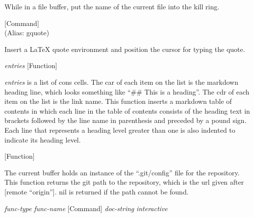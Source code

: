 \begin{doc-string}
While in a file buffer, put the name of the current file into the kill ring.
\end{doc-string}

\vspace{1em}
\noindent
{}
\usebox{\funcname}
 \hfill [Command]\\%
 (Alias: gquote)

\begin{doc-string}
Insert a LaTeX quote environment and position the cursor for typing the quote.
\end{doc-string}

\vspace{1em}
\noindent
{}
\usebox{\funcname}\emph{entries}
 \hfill [Function]

\begin{doc-string}
\emph{entries} is a list of cons cells.  The car of each item on the list is the
markdown heading line, which looks something like ``\#\# This is a heading''.
The cdr of each item on the list is the link name.  This function inserts a
markdown table of contents in which each line in the table of contents
consists of the heading text in brackets followed by the line name in
parenthesis and preceded by a pound sign.  Each line that represents a heading
level greater than one is also indented to indicate its heading level.
\end{doc-string}

\vspace{1em}
\noindent
{}
\usebox{\funcname}
 \hfill [Function]

\begin{doc-string}
The current buffer holds an instance of the ``.git/config'' file for the
repository.  This function returns the git path to the repository, which is the
url given after [remote ``origin''].  nil is returned if the path cannot be
found.
\end{doc-string}

\vspace{1em}
\noindent
{}
\usebox{\funcname}\emph{func-type} \emph{func-name}
 \hfill [Command]
\hspace*{\wd\funcname}\emph{doc-string} \emph{interactive}

